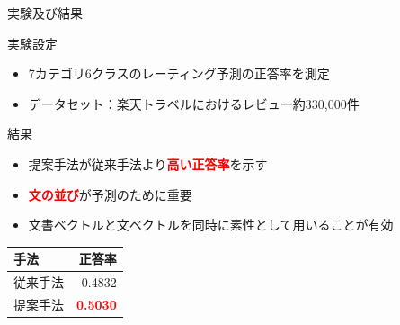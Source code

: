 \documentclass[aspectratio=43,unicode,10pt]{beamer}
\newcommand{\fire}[1]{\textcolor{red}{\textbf{#1}}}
\begin{document}
\begin{frame}{実験及び結果}{}
  \begin{block}{実験設定}
    \begin{itemize}
      \item 7カテゴリ6クラスのレーティング予測の正答率を測定
      \item データセット：楽天トラベルにおけるレビュー約330,000件
    \end{itemize}
  \end{block}
  \begin{block}{結果}
        \begin{itemize}
          \item 提案手法が従来手法より\fire{高い正答率}を示す
          \item \fire{文の並び}が予測のために重要
          \item 文書ベクトルと文ベクトルを同時に素性として用いることが有効
        \end{itemize}
        \begin{table}
          \centering
          \begin{tabular}{l | r} \label{tab:Accuracies}
            手法 & 正答率 \\
            \hline
            従来手法 & 0.4832 \\
            提案手法 & \fire{0.5030} \\
          \end{tabular}
        \end{table}
  \end{block}
\end{frame}
\end{document}
